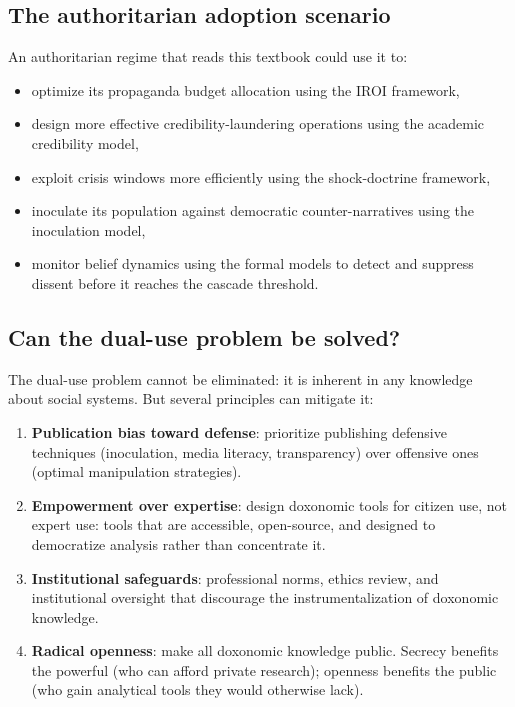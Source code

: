 \subsection{The authoritarian adoption scenario}

\begin{example}
\label{ex:authoritarian}
An authoritarian regime that reads this textbook could use it to:
\begin{itemize}[nosep]
  \item optimize its propaganda budget allocation using the IROI framework,
  \item design more effective credibility-laundering operations using the academic credibility model,
  \item exploit crisis windows more efficiently using the shock-doctrine framework,
  \item inoculate its population against democratic counter-narratives using the inoculation model,
  \item monitor belief dynamics using the formal models to detect and suppress dissent before it reaches the cascade threshold.
\end{itemize}
\end{example}

\subsection{Can the dual-use problem be solved?}

The dual-use problem cannot be eliminated: it is inherent in any knowledge about social systems.
But several principles can mitigate it:

\begin{enumerate}[nosep]
  \item \textbf{Publication bias toward defense}: prioritize publishing defensive techniques (inoculation, media literacy, transparency) over offensive ones (optimal manipulation strategies).
  \item \textbf{Empowerment over expertise}: design doxonomic tools for citizen use, not expert use: tools that are accessible, open-source, and designed to democratize analysis rather than concentrate it.
  \item \textbf{Institutional safeguards}: professional norms, ethics review, and institutional oversight that discourage the instrumentalization of doxonomic knowledge.
  \item \textbf{Radical openness}: make all doxonomic knowledge public. Secrecy benefits the powerful (who can afford private research); openness benefits the public (who gain analytical tools they would otherwise lack).
\end{enumerate}


